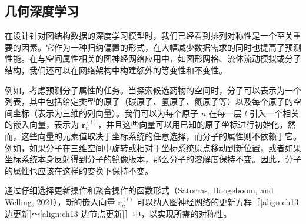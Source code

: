 \documentclass[../../main.tex]{subfiles}
\begin{document}
\subsection{几何深度学习}\label{subsection:ch13-几何深度学习}

在设计针对图结构数据的深度学习模型时，我们已经看到排列对称性是一个至关重要的因素。它作为一种归纳偏置的形式，在大幅减少数据需求的同时也提高了预测性能。在与空间属性相关的图神经网络应用中，如图形网格、流体流动模拟或分子结构，我们还可以在网络架构中构建额外的等变性和不变性。

例如，考虑预测分子属性的任务。当探索候选药物的空间时，分子可以表示为一个列表，其中包括给定类型的原子（碳原子、氢原子、氮原子等）以及每个原子的空间坐标（表示为三维的列向量）。我们可以为每个原子 $n$ 在每一层 $l$ 引入一个相关的嵌入向量，表示为 $\bm{r}_n^{(l)}$，并且这些向量可以用已知的原子坐标进行初始化。然而，这些向量的元素值取决于坐标系统的任意选择，而分子的属性则不依赖于它。例如，如果分子在三维空间中旋转或相对于坐标系统原点移动到新位置，或者如果坐标系统本身反射得到分子的镜像版本，那么分子的溶解度保持不变。因此，分子的属性也应该在这样的变换下保持不变。

通过仔细选择更新操作和聚合操作的函数形式（Satorras, Hoogeboom, and Welling, 2021），新的嵌入向量 $\bm{r}_n^{(l)}$ 可以纳入图神经网络的更新方程［\eqref{align:ch13-边更新}～\eqref{align:ch13-边节点更新}］中，以实现所需的对称性。
\end{document}
